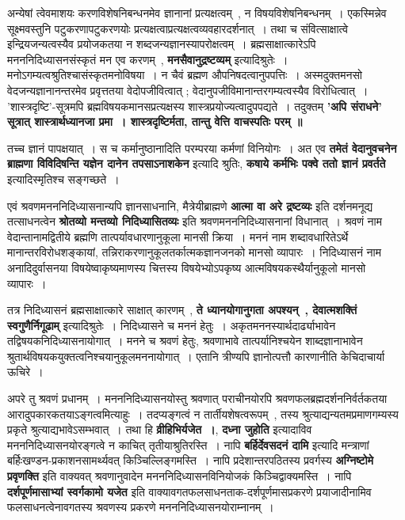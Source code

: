 	अन्येषां त्वेवमाशयः करणविशेषनिबन्धनमेव ज्ञानानां प्रत्यक्षत्वम्~, न विषयविशेषनिबन्धनम्~। एकस्मिन्नेव सूक्ष्मवस्तुनि पटुकरणापटुकरणयोः प्रत्यक्षत्वाप्रत्यक्षत्वव्यवहारदर्शनात्~। तथा च संवित्साक्षात्वे इन्द्रियजन्यत्वस्यैव प्रयोजकतया न शब्दजन्यज्ञानस्यापरोक्षत्वम्~। ब्रह्मसाक्षात्कारेऽपि मनननिदिध्यासनसंस्कृतं मन एव करणम्~, {\bfseries मनसैवानुद्रष्टव्यम्} इत्यादिश्रुतेः~। मनोऽगम्यत्वश्रुतिश्चासंस्कृतमनोविषया~। न चैवं ब्रह्मण औपनिषदत्वानुपपत्तिः~। अस्मदुक्तमनसो वेदजन्यज्ञानानन्तरमेव प्रवृत्ततया वेदोपजीवित्वात् ; वेदानुपजीविमानान्तरगम्यत्वस्यैव विरोधित्वात्~। 'शास्त्रदृष्टि'-सूत्रमपि ब्रह्मविषयकमानसप्रत्यक्षस्य शास्त्रप्रयोज्यत्वादुपपद्यते~। तदुक्तम् {\bfseries 'अपि संराधने' सूत्रात् शास्त्रार्थध्यानजा प्रमा~। शास्त्रदृष्टिर्मता, तान्तु वेत्ति वाचस्पतिः परम् ॥}\par
	तच्च ज्ञानं पापक्षयात्~। स च कर्मानुष्ठानादिति परम्परया कर्मणां विनियोगः~। अत एव {\bfseries तमेतं वेदानुवचनेन ब्राह्मणा विविदिषन्ति यज्ञेन दानेन तपसाऽनाशकेन} इत्यादि श्रुतिः, {\bfseries कषाये कर्मभिः पक्वे ततो ज्ञानं प्रवर्तते} इत्यादिस्मृतिश्च सङ्गच्छते~।\par
	एवं श्रवणमनननिदिध्यासनान्यपि ज्ञानसाधनानि, मैत्रेयीब्राह्मणे {\bfseries आत्मा वा अरे द्रष्टव्यः} इति दर्शनमनूद्य तत्साधनत्वेन {\bfseries श्रोतव्यो मन्तव्यो निदिध्यासितव्यः} इति श्रवणमनननिदिध्यासनानां विधानात्~। श्रवणं नाम वेदान्तानामद्वितीये ब्रह्मणि तात्पर्यावधारणानुकूला मानसी क्रिया~। मननं नाम शब्दावधारितेऽर्थे मानान्तरविरोधशङ्कायां, तन्निराकरणानुकूलतर्कात्मकज्ञानजनको मानसो व्यापारः~। निदिध्यासनं नाम अनादिदुर्वासनया विषयेष्वाकृष्यमाणस्य चित्तस्य विषयेभ्योऽपकृष्य आत्मविषयकस्थैर्यानुकूलो मानसो व्यापारः~।\par
	तत्र निदिध्यासनं ब्रह्मसाक्षात्कारे साक्षात् कारणम्~, {\bfseries ते ध्यानयोगानुगता अपश्यन्~, देवात्मशक्तिं स्वगुणैर्निगूढाम्} इत्यादिश्रुतेः~। निदिध्यासने च मननं हेतुः~। अकृतमननस्यार्थदार्ढ्याभावेन तद्विषयकनिदिध्यासनायोगात्~। मनने च श्रवणं हेतुः, श्रवणाभावे तात्पर्यानिश्चयेन शाब्दज्ञानाभावेन श्रुतार्थविषयकयुक्तत्वनिश्चयानुकूलमननायोगात्~। एतानि त्रीण्यपि ज्ञानोत्पत्तौ कारणानीति केचिदाचार्या ऊचिरे~।\par
	अपरे तु श्रवणं प्रधानम्~। मनननिदिध्यासनयोस्तु श्रवणात् पराचीनयोरपि श्रवणफलब्रह्मदर्शननिर्वर्तकतया आरादुपकारकतयाऽङ्गत्वमित्याहुः~। तदप्यङ्गत्वं न तार्तीयशेषत्वरूपम्~, तस्य श्रुत्याद्यन्यतमप्रमाणगम्यस्य प्रकृते श्रुत्याद्यभावेऽसम्भवात्~। तथा हि {\bfseries व्रीहिभिर्यजेत~।}, {\bfseries दध्ना जुहोति} इत्यादाविव मनननिदिध्यासनयोरङ्गत्वे न काचित् तृतीयाश्रुतिरस्ति~। नापि {\bfseries बर्हिर्देवसदनं दामि} इत्यादि मन्त्राणां बर्हिःखण्डन-प्रकाशनसामर्थ्यवत् किञ्चिल्लिङ्गमस्ति~। नापि प्रदेशान्तरपठितस्य प्रवर्गस्य {\bfseries अग्निष्टोमे प्रवृणक्ति} इति वाक्यवत् श्रवणानुवादेन मनननिदिध्यासनविनियोजकं किञ्चिद्वाक्यमस्ति~। नापि {\bfseries दर्शपूर्णमासाभ्यां स्वर्गकामो यजेत} इति वाक्यावगतफलसाधनताक-दर्शपूर्णमासप्रकरणे प्रयाजादीनामिव फलसाधनत्वेनावगतस्य श्रवणस्य प्रकरणे मनननिदिध्यासनयोराम्नानम्~।\par
